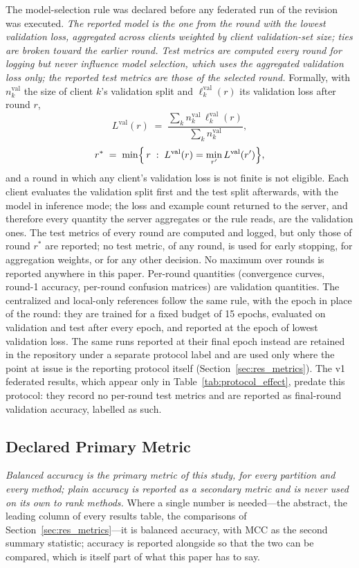 \documentclass[journal]{IEEEtran}
\begin{document}
The model-selection rule was declared before any federated run of the revision was executed. \emph{The reported model is the one from the round with the lowest validation loss, aggregated across clients weighted by client validation-set size; ties are broken toward the earlier round. Test metrics are computed every round for logging but never influence model selection, which uses the aggregated validation loss only; the reported test metrics are those of the selected round.} Formally, with $n_k^{\mathrm{val}}$ the size of client $k$'s validation split and $\ell_k^{\mathrm{val}}(r)$ its validation loss after round $r$,
\[
L^{\mathrm{val}}(r) \;=\; \frac{\sum_{k} n_k^{\mathrm{val}}\, \ell_k^{\mathrm{val}}(r)}{\sum_{k} n_k^{\mathrm{val}}},
\]
\[
r^{*} \;=\; \min\Bigl\{\, r \;:\; L^{\mathrm{val}}(r) = \min_{r'} L^{\mathrm{val}}(r') \Bigr\},
\]
and a round in which any client's validation loss is not finite is not eligible. Each client evaluates the validation split first and the test split afterwards, with the model in inference mode; the loss and example count returned to the server, and therefore every quantity the server aggregates or the rule reads, are the validation ones. The test metrics of every round are computed and logged, but only those of round $r^{*}$ are reported; no test metric, of any round, is used for early stopping, for aggregation weights, or for any other decision. No maximum over rounds is reported anywhere in this paper. Per-round quantities (convergence curves, round-1 accuracy, per-round confusion matrices) are validation quantities. The centralized and local-only references follow the same rule, with the epoch in place of the round: they are trained for a fixed budget of 15 epochs, evaluated on validation and test after every epoch, and reported at the epoch of lowest validation loss. The same runs reported at their final epoch instead are retained in the repository under a separate protocol label and are used only where the point at issue is the reporting protocol itself (Section~\ref{sec:res_metrics}). The v1 federated results, which appear only in Table~\ref{tab:protocol_effect}, predate this protocol: they record no per-round test metrics and are reported as final-round validation accuracy, labelled as such.

\subsection{Declared Primary Metric}
\label{sec:primary}

\emph{Balanced accuracy is the primary metric of this study, for every partition and every method; plain accuracy is reported as a secondary metric and is never used on its own to rank methods.} Where a single number is needed---the abstract, the leading column of every results table, the comparisons of Section~\ref{sec:res_metrics}---it is balanced accuracy, with MCC as the second summary statistic; accuracy is reported alongside so that the two can be compared, which is itself part of what this paper has to say.
\end{document}
